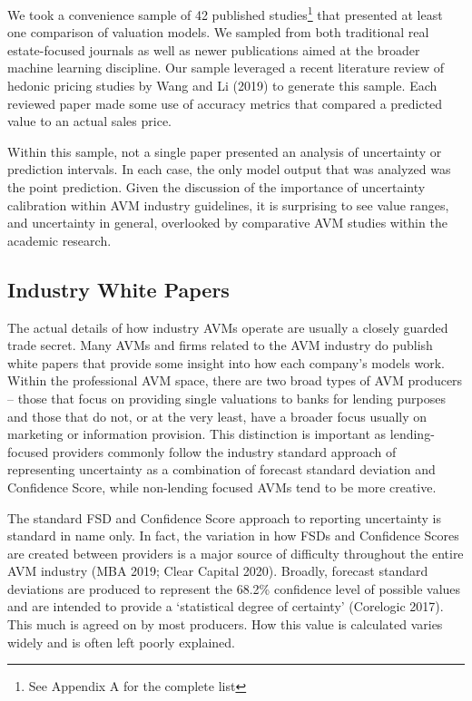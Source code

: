 \documentclass[colTwo]{anon}
\theoremstyle{definition}
\begin{document}
We took a convenience sample of 42 published studies\footnote{See Appendix A for the complete list} that presented at least one comparison of valuation models. We sampled from both traditional real estate-focused journals as well as newer publications aimed at the broader machine learning discipline. Our sample leveraged a recent literature review of hedonic pricing studies by Wang and Li (2019) to generate this sample.  Each reviewed paper made some use of accuracy metrics that compared a predicted value to an actual sales price.

Within this sample, not a single paper presented an analysis of uncertainty or prediction intervals. In each case, the only model output that was analyzed was the point prediction.  Given the discussion of the importance of uncertainty calibration within AVM industry guidelines, it is surprising to see value ranges, and uncertainty in general, overlooked by comparative AVM studies within the academic research.

\subsection{Industry White Papers}

The actual details of how industry AVMs operate are usually a closely guarded trade secret. Many AVMs and firms related to the AVM industry do publish white papers that provide some insight into how each company’s models work.   Within the professional AVM space, there are two broad types of AVM producers -- those that focus on providing single valuations to banks for lending purposes and those that do not, or at the very least, have a broader focus usually on marketing or information provision.  This distinction is important as lending-focused providers commonly follow the industry standard approach of representing uncertainty as a combination of forecast standard deviation and Confidence Score, while non-lending focused AVMs tend to be more creative.

The standard FSD and Confidence Score approach to reporting uncertainty is standard in name only. In fact, the variation in how FSDs and Confidence Scores are created between providers is a major source of difficulty throughout the entire AVM industry (MBA 2019; Clear Capital 2020).  Broadly, forecast standard deviations are produced to represent the 68.2\% confidence level of possible values and are intended to provide a ‘statistical degree of certainty’ (Corelogic 2017).  This much is agreed on by most producers.  How this value is calculated varies widely and is often left poorly explained.
\end{document}
